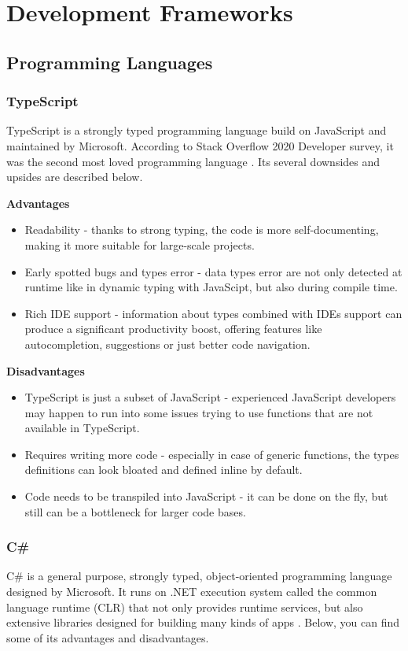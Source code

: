 \chapter{Development Frameworks} \label{ch:development_frameworks}

\section{Programming Languages}

\subsection{TypeScript}
TypeScript is a strongly typed programming language build on JavaScript and maintained by Microsoft. According to Stack Overflow 2020 Developer survey, it was the second most loved programming language \cite{type_script}. Its several downsides and upsides are described below.

\textbf{Advantages}
\begin{itemize}
    \item Readability - thanks to strong typing, the code is more self-documenting, making it more suitable for large-scale projects.
    \item Early spotted bugs and types error - data types error are not only detected at runtime like in dynamic typing with JavaScipt, but also during compile time.
    \item Rich IDE support - information about types combined with IDEs support can produce a significant productivity boost, offering features like autocompletion, suggestions or just better code navigation.
\end{itemize}

\textbf{Disadvantages}
\begin{itemize}
    \item TypeScript is just a subset of JavaScript - experienced JavaScript developers may happen to run into some issues trying to use functions that are not available in TypeScript.
    \item Requires writing more code - especially in case of generic functions, the types definitions can look bloated and defined inline by default.
    \item Code needs to be transpiled into JavaScript - it can be done on the fly, but still can be a bottleneck for larger code bases.
\end{itemize}

\subsection{C\#}
C\# is a general purpose, strongly typed, object-oriented programming language designed by Microsoft. It runs on .NET execution system called the common language runtime (CLR) that not only provides runtime services, but also extensive libraries designed for building many kinds of apps \cite{c-sharp-tour}. Below, you can find some of its advantages and disadvantages.

